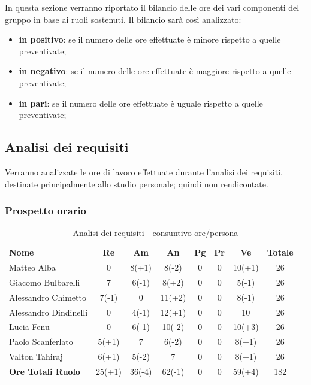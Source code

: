
In questa sezione verranno riportato il bilancio delle ore dei vari componenti del gruppo in base ai ruoli sostenuti. Il bilancio sarà così analizzato:
\begin{itemize}
	\item {\bfseries in positivo}: se il numero delle ore effettuate è minore rispetto a quelle preventivate;
	\item {\bfseries in negativo}: se il numero delle ore effettuate è maggiore rispetto a quelle preventivate;
	\item {\bfseries in pari}: se il numero delle ore effettuate è uguale rispetto a quelle preventivate; \\
\end{itemize}

\subsection {Analisi dei requisiti}
Verranno analizzate le ore di lavoro effettuate durante l'analisi dei requisiti, destinate principalmente allo studio personale; quindi non rendicontate.
\subsubsection{Prospetto orario}
	\begin{table} [h!]
	\begin{center}
		\begin{tabular} { m{6 cm} c c c c c c c c }
			\rowcolor{lightgray}
			\textbf{Nome} & \textbf{Re} & \textbf{Am} & \textbf{An} & \textbf{Pg} &\textbf{Pr} & \textbf{Ve} & \textbf{Totale} \\ 
			Matteo Alba & 0 & 8(+1) &8(-2) & 0 & 0 & 10(+1) & 26  \\ 
			Giacomo Bulbarelli & 7 & 6(-1) & 8(+2) & 0 & 0 & 5(-1) & 26 \\ 
			Alessandro Chimetto & 7(-1) & 0 & 11(+2) & 0 & 0 & 8(-1) & 26 \\
			Alessandro Dindinelli & 0 & 4(-1) & 12(+1) & 0 & 0 & 10 & 26 \\
			Lucia Fenu & 0 & 6(-1) & 10(-2) & 0 & 0 & 10(+3) & 26 \\
			Paolo Scanferlato & 5(+1) & 7 & 6(-2) & 0 & 0 & 8(+1) & 26 \\
			Valton Tahiraj & 6(+1) & 5(-2) &7 & 0 & 0 & 8(+1) & 26 \\
			\textbf{Ore Totali Ruolo} & 25(+1) & 36(-4) & 62(-1) & 0 & 0 & 59(+4) & 182\\
		
		\end{tabular}
		\caption{Analisi dei requisiti - consuntivo ore/persona}
	\end{center}
\end{table}


